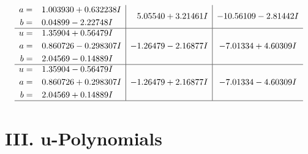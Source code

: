 \documentclass[1p]{elsarticle_modified}
\theoremstyle{definition}
\begin{document}
$$\begin{array}{c|c|c}
\begin{aligned}
a &= \phantom{-}1.003930 + 0.632238 I \\
b &= \phantom{-}0.04899 - 2.22748 I\end{aligned}
 & \phantom{-}5.05540 + 3.21461 I & -10.56109 - 2.81442 I \\ \hline\begin{aligned}
u &= \phantom{-}1.35904 + 0.56479 I \\
a &= \phantom{-}0.860726 - 0.298307 I \\
b &= \phantom{-}2.04569 - 0.14889 I\end{aligned}
 & -1.26479 - 2.16877 I & -7.01334 + 4.60309 I \\ \hline\begin{aligned}
u &= \phantom{-}1.35904 - 0.56479 I \\
a &= \phantom{-}0.860726 + 0.298307 I \\
b &= \phantom{-}2.04569 + 0.14889 I\end{aligned}
 & -1.26479 + 2.16877 I & -7.01334 - 4.60309 I\\
 \hline 
 \end{array}$$\newpage
\newpage\renewcommand{\arraystretch}{1}
\centering \section*{ III. u-Polynomials}
\end{document}

